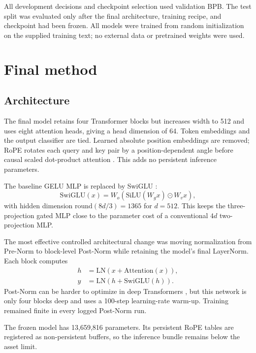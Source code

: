 \documentclass[10pt]{article}
\begin{document}
All development decisions and checkpoint selection used validation BPB. The test split was evaluated only after the final architecture, training recipe, and checkpoint had been frozen. All models were trained from random initialization on the supplied training text; no external data or pretrained weights were used.

\section{Final method}

\subsection{Architecture}

The final model retains four Transformer blocks but increases width to 512 and uses eight attention heads, giving a head dimension of 64. Token embeddings and the output classifier are tied. Learned absolute position embeddings are removed; RoPE rotates each query and key pair by a position-dependent angle before causal scaled dot-product attention \cite{su2021roformer}. This adds no persistent inference parameters.

The baseline GELU MLP is replaced by SwiGLU \cite{shazeer2020glu}:
\begin{equation}
\mathrm{SwiGLU}(x)=W_o\left(\mathrm{SiLU}(W_gx)\odot W_vx\right),
\end{equation}
with hidden dimension $\mathrm{round}(8d/3)=1365$ for $d=512$. This keeps the three-projection gated MLP close to the parameter cost of a conventional $4d$ two-projection MLP.

The most effective controlled architectural change was moving normalization from Pre-Norm to block-level Post-Norm while retaining the model's final LayerNorm. Each block computes
\begin{align}
h &= \mathrm{LN}\left(x+\mathrm{Attention}(x)\right),\\
y &= \mathrm{LN}\left(h+\mathrm{SwiGLU}(h)\right).
\end{align}
Post-Norm can be harder to optimize in deep Transformers \cite{xiong2020layernorm}, but this network is only four blocks deep and uses a 100-step learning-rate warm-up. Training remained finite in every logged Post-Norm run.

The frozen model has 13,659,816 parameters. Its persistent RoPE tables are registered as non-persistent buffers, so the inference bundle remains below the asset limit.
\end{document}
